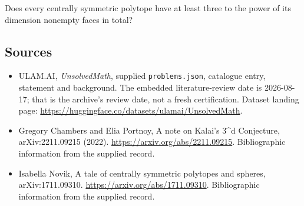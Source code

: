 \documentclass[11pt,a4paper]{article}
\begin{document}
Does every centrally symmetric polytope have at least three to the power of its dimension nonempty faces in total?

\subsection{Sources}

{\small

\begin{itemize}

\item[\hypertarget{source:statement:1}{S1}] ULAM.AI, \emph{UnsolvedMath}, supplied \texttt{problems.json}, catalogue entry, statement and background. The embedded literature-review date is 2026-08-17; that is the archive’s review date, not a fresh certification. Dataset landing page: \url{https://huggingface.co/datasets/ulamai/UnsolvedMath}.

\item[\hypertarget{source:statement:2}{S2}] Gregory Chambers and Elia Portnoy, A note on Kalai's 3\textasciicircum{}d Conjecture, arXiv:2211.09215 (2022). \url{https://arxiv.org/abs/2211.09215}. Bibliographic information from the supplied record.

\item[\hypertarget{source:statement:3}{S3}] Isabella Novik, A tale of centrally symmetric polytopes and spheres, arXiv:1711.09310. \url{https://arxiv.org/abs/1711.09310}. Bibliographic information from the supplied record.

\end{itemize}

}

\label{end:statement}
\end{document}

